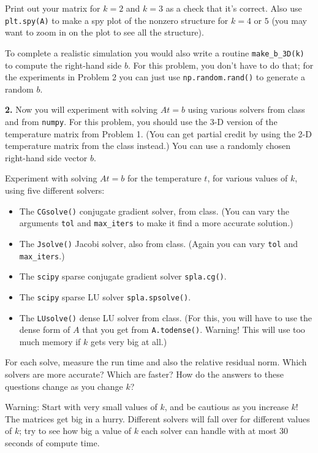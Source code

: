 \documentclass[11pt]{article}
\begin{document}
Print out your matrix for $k=2$ and $k=3$ as a check that it's correct. 
Also use {\tt plt.spy(A)} to make a spy plot of the nonzero structure 
for $k=4$ or $5$ (you may want to zoom in on the plot to see all the structure).

To complete a realistic simulation you would also 
write a routine {\tt make\_b\_3D(k)} to compute the right-hand side $b$.
For this problem, you don't have to do that; 
for the experiments in Problem 2 you can just use {\tt np.random.rand()}
to generate a random $b$.

\par\bigskip
{\bf 2.} 
Now you will experiment with solving $At=b$ using various solvers
from class and from {\tt numpy}.
For this problem, you should use the 3-D version of the temperature matrix
from Problem 1. 
(You can get partial credit by using the 2-D temperature matrix from the
class instead.)
You can use a randomly chosen right-hand side vector $b$.

Experiment with solving $At=b$ for the temperature $t$, 
for various values of $k$, using five different solvers:
\begin{itemize}
\item The {\tt CGsolve()} conjugate gradient solver, from class.
(You can vary the arguments {\tt tol} and {\tt max\_iters} to
make it find a more accurate solution.)
\item The {\tt Jsolve()} Jacobi solver, also from class.
(Again you can vary {\tt tol} and {\tt max\_iters}.)
\item The {\tt scipy} sparse conjugate gradient solver {\tt spla.cg()}.
\item The {\tt scipy} sparse LU solver {\tt spla.spsolve()}.
\item The {\tt LUsolve()} dense LU solver from class.
(For this, you will have to use the dense form of $A$ that you get
from {\tt A.todense()}. Warning! This will use too much memory if
$k$ gets very big at all.)
\end{itemize}
For each solve, measure the run time and also the relative residual norm.
Which solvers are more accurate? Which are faster? How do the
answers to these questions change as you change $k$?

Warning: Start with very small values of $k$, and be cautious
as you increase $k$!
The matrices get big in a hurry.
Different solvers will fall over for different values of $k$;
try to see how big a value of $k$ each solver can handle with
at most 30 seconds of compute time.
\end{document}
